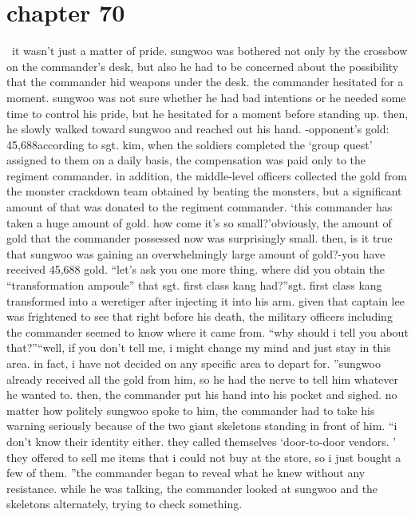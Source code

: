 \section{chapter 70}






 it wasn’t just a matter of pride.
 sungwoo was bothered not only by the crossbow on the commander’s desk, but also he had to be concerned about the possibility that the commander hid weapons under the desk.
the commander hesitated for a moment.
 sungwoo was not sure whether he had bad intentions or he needed some time to control his pride, but he hesitated for a moment before standing up.
 then, he slowly walked toward sungwoo and reached out his hand.
-opponent’s gold: 45,688according to sgt.
 kim, when the soldiers completed the ‘group quest’ assigned to them on a daily basis, the compensation was paid only to the regiment commander.
in addition, the middle-level officers collected the gold from the monster crackdown team obtained by beating the monsters, but a significant amount of that was donated to the regiment commander.
‘this commander has taken a huge amount of gold.
 how come it’s so small?’obviously, the amount of gold that the commander possessed now was surprisingly small.
then, is it true that sungwoo was gaining an overwhelmingly large amount of gold?-you have received 45,688 gold.
“let’s ask you one more thing.
 where did you obtain the “transformation ampoule” that sgt.
 first class kang had?”sgt.
 first class kang transformed into a weretiger after injecting it into his arm.
 given that captain lee was frightened to see that right before his death, the military officers including the commander seemed to know where it came from.
“why should i tell you about that?”“well, if you don’t tell me, i might change my mind and just stay in this area.
 in fact, i have not decided on any specific area to depart for.
”sungwoo already received all the gold from him, so he had the nerve to tell him whatever he wanted to.
 then, the commander put his hand into his pocket and sighed.
no matter how politely sungwoo spoke to him, the commander had to take his warning seriously because of the two giant skeletons standing in front of him.
“i don’t know their identity either.
 they called themselves ‘door-to-door vendors.
’ they offered to sell me items that i could not buy at the store, so i just bought a few of them.
”the commander began to reveal what he knew without any resistance.
 while he was talking, the commander looked at sungwoo and the skeletons alternately, trying to check something.
